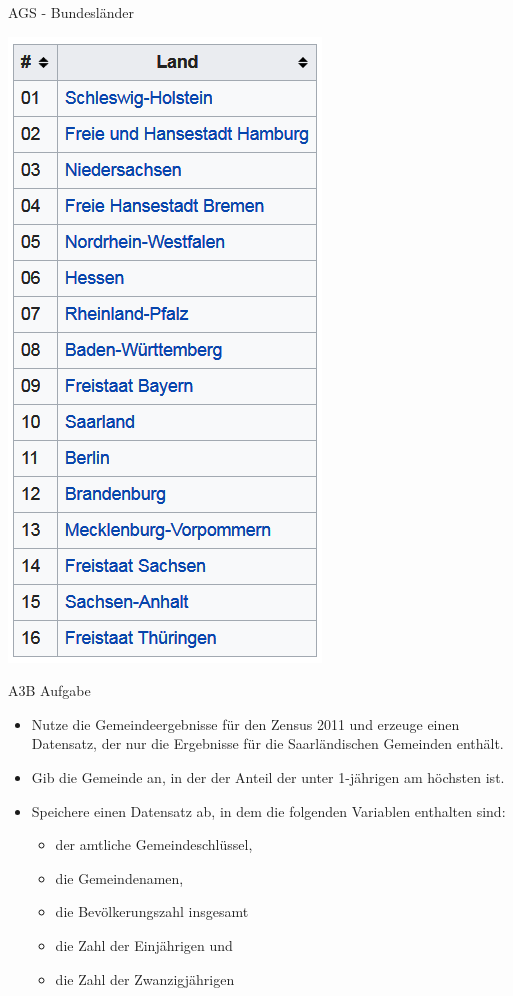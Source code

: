 \documentclass[ignorenonframetext,]{beamer}
\providecommand{\tightlist}{%
  \setlength{\itemsep}{0pt}\setlength{\parskip}{0pt}}
\begin{document}
\begin{frame}{AGS - Bundesländer}
\protect\hypertarget{ags---bundeslander}{}

\includegraphics{figure/AGS_BLA.PNG}

\end{frame}

\begin{frame}{A3B Aufgabe}
\protect\hypertarget{a3b-aufgabe}{}

\begin{itemize}
\tightlist
\item
  Nutze die Gemeindeergebnisse für den Zensus 2011 und erzeuge einen
  Datensatz, der nur die Ergebnisse für die Saarländischen Gemeinden
  enthält.
\item
  Gib die Gemeinde an, in der der Anteil der unter 1-jährigen am
  höchsten ist.
\item
  Speichere einen Datensatz ab, in dem die folgenden Variablen enthalten
  sind:

  \begin{itemize}
  \tightlist
  \item
    der amtliche Gemeindeschlüssel,
  \item
    die Gemeindenamen,\\
  \item
    die Bevölkerungszahl insgesamt
  \item
    die Zahl der Einjährigen und
  \item
    die Zahl der Zwanzigjährigen
  \end{itemize}
\end{itemize}

\end{frame}
\end{document}
